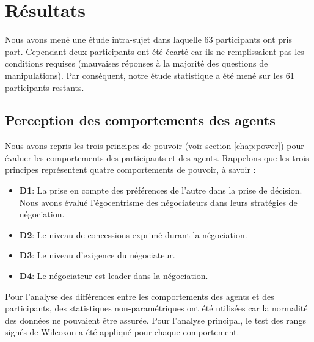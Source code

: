 \section{Résultats}
\label{sec:res}
	Nous avons mené une étude intra-sujet dans laquelle 63 participants ont pris part. Cependant deux participants ont été écarté car ils ne remplissaient pas les conditions requises (mauvaises réponses à la majorité des questions de manipulations). Par conséquent, notre étude statistique a été mené sur les 61 participants restants. 
		

	\subsection{Perception des comportements des agents}

	Nous avons repris les trois principes de pouvoir (voir section \ref{chap:power}) pour évaluer les comportements des participants et des agents. 
	Rappelons que les trois principes représentent quatre  comportements de pouvoir, à savoir :
	
	\begin{itemize}
		\item \textbf{D1}: La prise en compte des préférences de l'autre dans la prise de décision. Nous avons évalué l'égocentrisme des négociateurs dans leurs stratégies de négociation. 
		\item \textbf{D2}: Le niveau de concessions exprimé durant la négociation.
		\item \textbf{D3}: Le niveau d'exigence du négociateur.
		\item \textbf{D4}: Le négociateur est leader dans la négociation.
	\end{itemize}
	
	Pour l'analyse des différences entre les comportements des agents et des participants, des statistiques non-paramétriques ont été utilisées car la normalité des données ne pouvaient être assurée. Pour l'analyse principal, le test des rangs signés de Wilcoxon a été appliqué pour chaque comportement.
	
